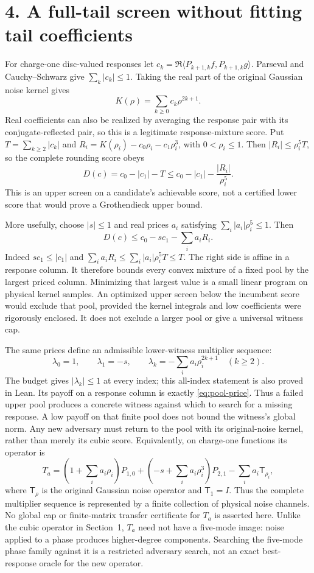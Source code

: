 \documentclass[11pt]{article}
\begin{document}
\section*{4. A full-tail screen without fitting tail coefficients}
For charge-one disc-valued responses let
$c_k=\Re\langle P_{k+1,k}f,P_{k+1,k}g\rangle$. Parseval and
Cauchy--Schwarz give $\sum_k|c_k|\le1$. Taking the real part of the original
Gaussian noise kernel gives
\[
 K(\rho)=\sum_{k\ge0}c_k\rho^{2k+1}.
\]
Real coefficients can also be realized by averaging the response pair with
its conjugate-reflected pair, so this is a legitimate response-mixture score.
Put $T=\sum_{k\ge2}|c_k|$ and
$R_i=K(\rho_i)-c_0\rho_i-c_1\rho_i^3$, with $0<\rho_i\le1$.
Then $|R_i|\le\rho_i^5 T$, so the complete rounding score obeys
\[
 D(c)=c_0-|c_1|-T
 \le c_0-|c_1|-\frac{|R_i|}{\rho_i^5}.
\]
This is an upper screen on a candidate's achievable score, not a certified
lower score that would prove a Grothendieck upper bound.

More usefully, choose $|s|\le1$ and real prices $a_i$ satisfying
$\sum_i|a_i|\rho_i^5\le1$. Then
\begin{equation}\label{eq:pool-price}
 D(c)\le c_0-sc_1-\sum_i a_iR_i.
\end{equation}
Indeed $sc_1\le|c_1|$ and
$\sum_i a_iR_i\le\sum_i|a_i|\rho_i^5T\le T$.
The right side is affine in a response column. It therefore bounds every
convex mixture of a fixed pool by the largest priced column. Minimizing that
largest value is a small linear program on physical kernel samples. An
optimized upper screen below the incumbent score would exclude that pool,
provided the kernel integrals and low coefficients were rigorously enclosed.
It does not exclude a larger pool or give a universal witness cap.

The same prices define an admissible lower-witness multiplier sequence:
\[
 \lambda_0=1,\qquad\lambda_1=-s,\qquad
 \lambda_k=-\sum_i a_i\rho_i^{2k+1}\quad(k\ge2).
\]
The budget gives $|\lambda_k|\le1$ at every index; this all-index statement is
also proved in Lean. Its payoff on a response column is exactly
\eqref{eq:pool-price}. Thus a failed upper pool produces a concrete witness
against which to search for a missing response. A low payoff on that finite
pool does not bound the witness's global norm. Any new adversary must return
to the pool with its original-noise kernel, rather than merely its cubic score.
Equivalently, on charge-one functions its operator is
\[
 T_a=\left(1+\sum_i a_i\rho_i\right)P_{1,0}
 +\left(-s+\sum_i a_i\rho_i^3\right)P_{2,1}
 -\sum_i a_i\mathsf T_{\rho_i},
\]
where $\mathsf T_\rho$ is the original Gaussian noise operator and
$\mathsf T_1=I$. Thus the complete multiplier sequence is represented by a
finite collection of physical noise channels. No global cap or finite-matrix
transfer certificate for $T_a$ is asserted here.
Unlike the cubic operator in Section~1, $T_a$ need not have a five-mode image:
noise applied to a phase produces higher-degree components. Searching the
five-mode phase family against it is a restricted adversary search, not an
exact best-response oracle for the new operator.
\end{document}
